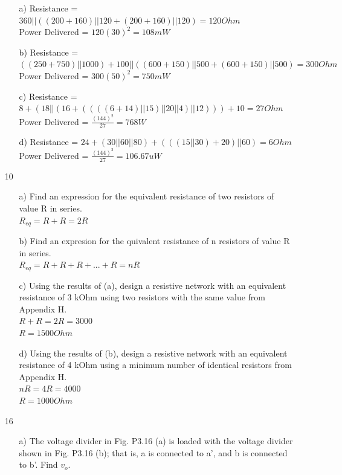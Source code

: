 \documentclass[a4paper]{article}
\begin{document}
\begin{itemize}
	      \begin{itemize}
	      	\item[a)] Resistance = $360 || ((200 + 160) || 120 + (200 + 160) || 120) = 120 Ohm$ \\
	      	      Power Delivered = $120(30)^2 = 108 mW$
	      	\item[b)] Resistance = $((250 + 750) || 1000) + 100 || ((600 + 150) || 500 + (600 + 150) || 500) = 300 Ohm$ \\
	      	      Power Delivered = $300(50)^2 = 750 mW$ 
	      	\item[c)] Resistance = $8 + (18 || (16 + ((((6 + 14) || 15) || 20 || 4) || 12))) + 10 = 27 Ohm$ \\
	      	      Power Delivered = $\frac{(144)^2}{27} = 768 W$
	      	\item[d)] Resistance = $24 + (30 || 60 || 80) + (((15 || 30) + 20) || 60) = 6 Ohm$ \\
	      	      Power Delivered = $\frac{(144)^2}{27} = 106.67 uW$
	      \end{itemize}
	\item[10] 
	      \begin{itemize}
	      	\item[a)] Find an expression for the equivalent resistance of two resistors of value R in series. \\
	      	      $R_{eq} = R + R = 2R$ 
	      	\item[b)] Find an expresion for the quivalent resistance of n resistors of value R in series. \\
	      	      $R_{eq} = R + R + R + ... + R = nR$ 
	      	\item[c)] Using the results of (a), design a resistive network with an equivalent resistance of 3 kOhm using two resistors with the same value from Appendix H. \\
	      	      $R + R = 2R = 3000$ \\
	      	      $R = 1500 Ohm$
	      	\item[d)] Using the results of (b), design a resistive network with an equivalent resistance of 4 kOhm using a minimum number of identical resistors from Appendix H. \\
	      	      $nR = 4R = 4000$ \\
	      	      $R = 1000 Ohm$
	      \end{itemize} 
	\item[16]
	      \begin{itemize}
	      	\item[a)] The voltage divider in Fig. P3.16 (a) is loaded with the voltage divider shown in Fig. P3.16 (b); that is, a is connected to a', and b is connected to b'. Find $v_{o}$. \\

\end{itemize}
\end{itemize}
\end{document}
